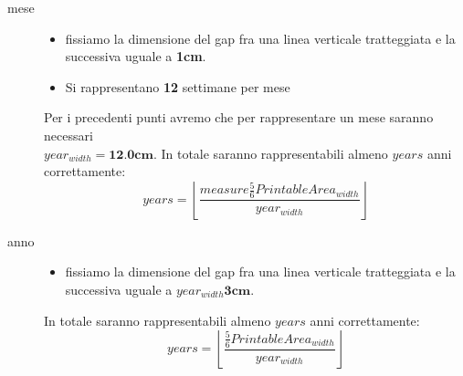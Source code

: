 \begin{description}
\item[mese] \quad
\begin{itemize}
  \item fissiamo la dimensione del gap fra una linea verticale tratteggiata
e la successiva uguale a \textbf{1cm}.
  \item Si rappresentano \textbf{12} settimane per mese
\end{itemize}

Per i precedenti punti avremo che per rappresentare un mese saranno
necessari\\ $year_{width} = \textbf{12.0cm}$. In totale saranno rappresentabili 
almeno $years$ anni correttamente:
\begin{displaymath}
	years = \left \lfloor \frac{measure \frac{5}{6}PrintableArea_{width}
	}{year_{width}}\right \rfloor
\end{displaymath}


\item[anno] \quad
\begin{itemize}
  \item fissiamo la dimensione del gap fra una linea verticale tratteggiata
e la successiva uguale a $year_{width}\textbf{3cm}$.
\end{itemize}

In totale saranno rappresentabili almeno $years$ anni correttamente:
\begin{displaymath}
	years = \left \lfloor \frac{\frac{5}{6}PrintableArea_{width}
	}{year_{width}}\right \rfloor
\end{displaymath}

\end{description}

